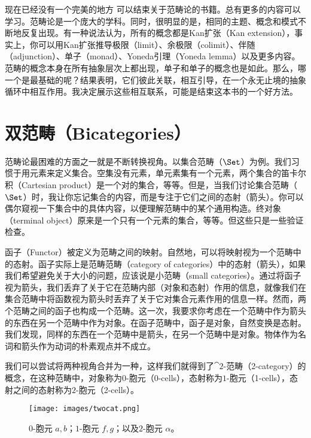 
\lettrine[lhang=0.17]{现}{在已经没有一个完美的地方} 可以结束关于范畴论的书籍。总有更多的内容可以学习。范畴论是一个庞大的学科。同时，很明显的是，相同的主题、概念和模式不断地反复出现。有一种说法认为，所有的概念都是Kan扩张（Kan extension），事实上，你可以用Kan扩张推导极限（limit）、余极限（colimit）、伴随（adjunction）、单子（monad）、Yoneda引理（Yoneda lemma）以及更多内容。范畴的概念本身在所有抽象层次上都出现，单子和单子的概念也是如此。那么，哪一个是最基础的呢？结果表明，它们彼此关联，相互引导，在一个永无止境的抽象循环中相互作用。我决定展示这些相互联系，可能是结束这本书的一个好方法。

\section{双范畴（Bicategories）}

范畴论最困难的方面之一就是不断转换视角。以集合范畴（$\Set$）为例。我们习惯于用元素来定义集合。空集没有元素，单元素集有一个元素，两个集合的笛卡尔积（Cartesian product）是一个对的集合，等等。但是，当我们讨论集合范畴（$\Set$）时，我让你忘记集合的内容，而是专注于它们之间的态射（箭头）。你可以偶尔窥视一下集合中的具体内容，以便理解范畴中的某个通用构造。终对象（terminal object）原来是一个只有一个元素的集合，等等。但这些只是一些验证检查。

函子（Functor）被定义为范畴之间的映射。自然地，可以将映射视为一个范畴中的态射。函子实际上是范畴范畴（category of categories）中的态射（箭头），如果我们希望避免关于大小的问题，应该说是小范畴（small categories）。通过将函子视为箭头，我们丢弃了关于它在范畴内部（对象和态射）作用的信息，就像我们在集合范畴中将函数视为箭头时丢弃了关于它对集合元素作用的信息一样。然而，两个范畴之间的函子也构成一个范畴。这一次，我要求你考虑在一个范畴中作为箭头的东西在另一个范畴中作为对象。在函子范畴中，函子是对象，自然变换是态射。我们发现，同样的东西在一个范畴中是箭头，在另一个范畴中是对象。物体作为名词和箭头作为动词的朴素观点并不成立。

我们可以尝试将两种视角合并为一种，这样我们就得到了$\cat{2}$-范畴（2-category）的概念，在这种范畴中，对象称为$0$-胞元（0-cells），态射称为$1$-胞元（1-cells），态射之间的态射称为$2$-胞元（2-cells）。

\begin{figure}[H]
  \centering
  \texttt{[image: images/twocat.png]}
  \caption{$0$-胞元 $a, b$；$1$-胞元 $f, g$；以及$2$-胞元 $\alpha$。}
\end{figure}

